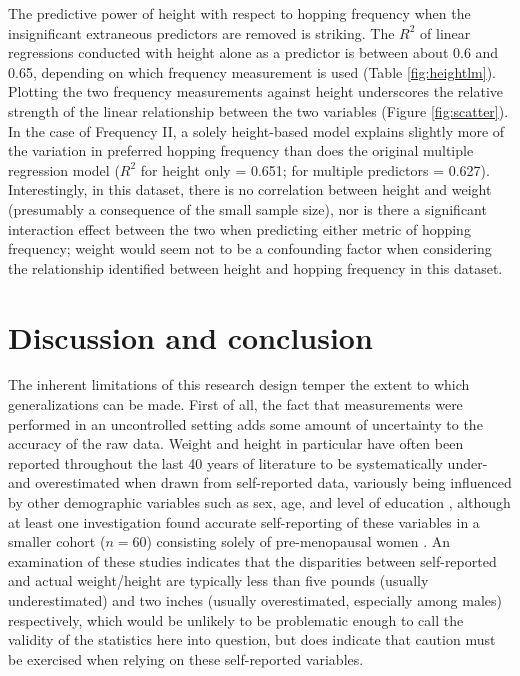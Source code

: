 \documentclass{article}
\begin{document}
The predictive power of height with respect to hopping frequency when the insignificant extraneous predictors are removed is striking. The $R^2$ of linear regressions conducted with height alone as a predictor is between about 0.6 and 0.65, depending on which frequency measurement is used (Table \ref{fig:heightlm}). Plotting the two frequency measurements against height underscores the relative strength of the linear relationship between the two variables (Figure \ref{fig:scatter}). In the case of Frequency II, a solely height-based model explains slightly more of the variation in preferred hopping frequency than does the original multiple regression model ($R^2$ for height only = 0.651; for multiple predictors = 0.627). Interestingly, in this dataset, there is no correlation between height and weight (presumably a consequence of the small sample size), nor is there a significant interaction effect between the two when predicting either metric of hopping frequency; weight would seem not to be a confounding factor when considering the relationship identified between height and hopping frequency in this dataset.

\section{Discussion and conclusion}

The inherent limitations of this research design temper the extent to which generalizations can be made. First of all, the fact that measurements were performed in an uncontrolled setting adds some amount of uncertainty to the accuracy of the raw data. Weight and height in particular have often been reported throughout the last 40 years of literature to be systematically under- and overestimated when drawn from self-reported data, variously being influenced by other demographic variables such as sex, age, and level of education \parencite{brener2003,engstrom2003,hodge2020,palta1982,spencer2002}, although at least one investigation found accurate self-reporting of these variables in a smaller cohort ($n = 60$) consisting solely of pre-menopausal women \parencite{roth2013}. An examination of these studies indicates that the disparities between self-reported and actual weight/height are typically less than five pounds (usually underestimated) and two inches (usually overestimated, especially among males) respectively, which would be unlikely to be problematic enough to call the validity of the statistics here into question, but does indicate that caution must be exercised when relying on these self-reported variables.
\end{document}
